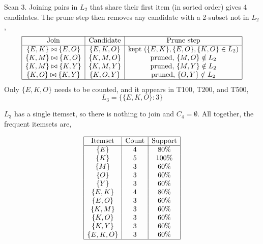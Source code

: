 \documentclass[12pt,letterpaper, onecolumn]{exam}
\begin{document}
\begin{questions}
\begin{solution}
\begin{enumerate}[a.)]
            Scan 3. Joining pairs in $L_2$ that share their first item (in sorted order) gives 4 candidates. The prune step then removes any candidate with a 2-subset not in $L_2$,
            \begin{equation*}
                \begin{array}{|c|c|c|}
                    \hline \text{Join} & \text{Candidate} & \text{Prune step} \\ \hline
                    \{E,K\}\bowtie\{E,O\} & \{E,K,O\} & \text{kept (}\{E,K\},\{E,O\},\{K,O\}\in L_2) \\
                    \{K,M\}\bowtie\{K,O\} & \{K,M,O\} & \text{pruned, } \{M,O\}\notin L_2 \\
                    \{K,M\}\bowtie\{K,Y\} & \{K,M,Y\} & \text{pruned, } \{M,Y\}\notin L_2 \\
                    \{K,O\}\bowtie\{K,Y\} & \{K,O,Y\} & \text{pruned, } \{O,Y\}\notin L_2 \\ \hline
                \end{array}
            \end{equation*}
            Only $\{E,K,O\}$ needs to be counted, and it appears in T100, T200, and T500,
            \begin{equation*}
                L_3 = \{\{E,K,O\}:3\}
            \end{equation*}

             $L_3$ has a single itemset, so there is nothing to join and $C_4=\emptyset$. All together, the frequent itemsets are,
             
            \begin{equation*}
                \begin{array}{|c|c|c|}
                    \hline \text{Itemset} & \text{Count} & \text{Support} \\ \hline
                    \{E\} & 4 & 80\% \\
                    \{K\} & 5 & 100\% \\
                    \{M\} & 3 & 60\% \\
                    \{O\} & 3 & 60\% \\
                    \{Y\} & 3 & 60\% \\
                    \{E,K\} & 4 & 80\% \\
                    \{E,O\} & 3 & 60\% \\
                    \{K,M\} & 3 & 60\% \\
                    \{K,O\} & 3 & 60\% \\
                    \{K,Y\} & 3 & 60\% \\
                    \{E,K,O\} & 3 & 60\% \\ \hline
                \end{array}
            \end{equation*}


\end{enumerate}
\end{solution}
\end{questions}
\end{document}
